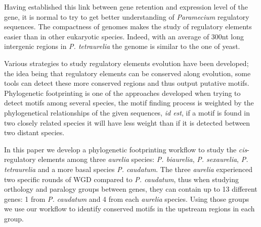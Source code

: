 Having established this link between gene retention and expression level of the gene, it is normal to try to get better understanding of \textit{Paramecium} regulatory sequences. The compactness of  genomes makes the study of regulatory elements easier than in other eukaryotic species. Indeed, with an average of 300nt long intergenic regions in \textit{P. tetraurelia} the genome is similar to the one of yeast.

Various strategies to study regulatory elements evolution have been developed; the idea being that regulatory elements can be conserved along evolution, some tools can detect these more conserved regions and thus output putative motifs. Phylogenetic footprinting is one of the approaches developed when trying to detect motifs among several species, the motif finding process is weighted by the phylogenetical relationships of the given sequences, \textit{id est}, if a motif is found in two closely related species it will have less weight than if it is detected between two distant species.

In this paper we develop a phylogenetic footprinting workflow to study the \textit{cis}-regulatory elements among three \textit{aurelia} species: \textit{P. biaurelia}, \textit{P. sexaurelia}, \textit{P. tetraurelia} and a more basal species \textit{P. caudatum}. The three \textit{aurelia} experienced two specific rounds of WGD compared to \textit{P. caudatum}, thus when studying orthology and paralogy groups between genes, they can contain up to 13 different genes: 1 from \textit{P. caudatum} and 4 from each \textit{aurelia} species. Using those groups we use our workflow to identify conserved motifs in the upstream regions in each group.

